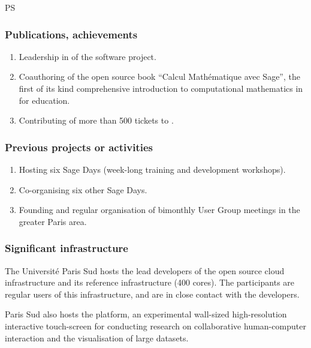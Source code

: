 \begin{sitedescription}{PS}
\subsubsection*{Publications, achievements}

\begin{enumerate}
\item Leadership in of the \SageCombinat software project.
\item Coauthoring of the open source book ``Calcul Mathématique avec
  Sage'', the first of its kind comprehensive introduction to
  computational mathematics in \Sage for education.
\item Contributing of more than 500 tickets to \Sage.
\end{enumerate}


\subsubsection*{Previous projects or activities}

\begin{enumerate}
\item Hosting six Sage Days (week-long training and development workshops).
\item Co-organising six other Sage Days.
\item Founding and regular organisation of bimonthly \Sage User Group
  meetings in the greater Paris area.
\end{enumerate}

\subsubsection*{Significant infrastructure}

The Université Paris Sud hosts the lead developers of the open source
cloud infrastructure  and its reference
infrastructure (400 cores). The participants are regular users
of this infrastructure, and are in close contact with the developers.

Paris Sud also hosts the  platform, an experimental wall-sized
high-resolution interactive touch-screen for conducting research on
collaborative human-computer interaction and the visualisation of
large datasets.

\end{sitedescription}



